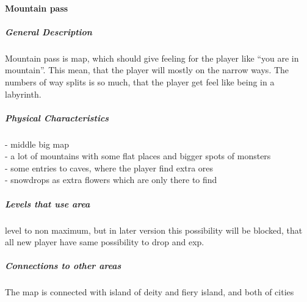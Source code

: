 \documentclass[parskip=full]{scrartcl}
\begin{document}
					\paragraph{Mountain pass}\vspace{-0.5cm}
						\subparagraph{General Description} \vspace{-0.5cm}
							\par \begingroup
							\leftskip=2cm
							\noindent
									Mountain pass is map, which should give feeling for the player like “you are in mountain”. This mean, that the player will mostly on the narrow ways. The numbers of way splits is so much, that the player get feel like being in a labyrinth.
							\par \endgroup
						\subparagraph{Physical Characteristics} \vspace{-0.5cm}
							\par \begingroup
							\leftskip=2cm
							\noindent
									- middle big map \\
									- a lot of mountains with some flat places and bigger spots of monsters \\
									- some entries to caves, where the player find extra ores \\
									- snowdrops as extra flowers which are only there to find
							\par \endgroup
						\subparagraph{Levels that use area} \vspace{-0.5cm}
							\par \begingroup
							\leftskip=2cm
							 level to non maximum, but in later version this possibility will be blocked, that all new player have same possibility to drop and exp. 
							\par \endgroup
						\subparagraph{Connections to other areas} \vspace{-0.5cm}
							\par \begingroup
							\leftskip=2cm
							\noindent
									The map is connected with island of deity and fiery island, and both of cities
							\par \endgroup
\end{document}
